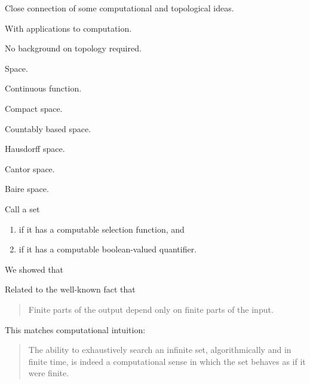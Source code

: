 \documentclass%
[%
Screen4to3,
]{foils}
\begin{document}

\vfill

 Close connection of some computational and
topological ideas.

\vfill

 With applications to computation.  

\vfill

 No background on topology required.

\vfill


Space.

Continuous function.

Compact space.

Countably based space.

Hausdorff space.

Cantor space.

Baire space.


Call a set
\begin{enumerate}
\item {} if it has a computable selection function, and
\item {} if it has a computable boolean-valued quantifier.
\end{enumerate}
We showed that
\begin{quote}
\end{quote}


Related to the well-known fact that
\begin{quote}

Finite parts of the output depend only on finite parts of the input. 
\end{quote}


\begin{quote}
\end{quote}

\vfill

This matches computational intuition:

\begin{quote}
The ability to
exhaustively search an infinite set, algorithmically and in finite
time, is indeed a computational sense in which the set behaves as if
it were finite. 
\end{quote}
\end{document}
